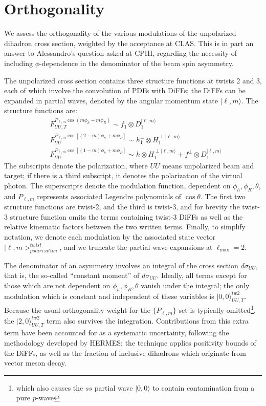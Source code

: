 \documentclass[12pt]{article}
\begin{document}
\section*{Orthogonality}

We assess the orthogonality of the various modulations of the unpolarized
dihadron cross section, weighted by the acceptance at CLAS. This is in part an
answer to Alessandro's question asked at CPHI, regarding the necessity of including
$\phi$-dependence in the denominator of the beam spin asymmetry.

The unpolarized
cross section contains three structure functions at twists 2 and 3, each of
which involve the convolution of PDFs with DiFFs; the DiFFs can be expanded in
partial waves, denoted by the angular momentum state $|\ell,m\rangle$. The
structure functions are:
\begin{align}
&F_{UU,T}^{P_{\ell,m}\cos\left(m\phi_h-m\phi_R\right)}
  \sim f_1\otimes D_1^{|\ell,m\rangle}\\
&F_{UU}^{P_{\ell,m}\cos\left[(2-m)\phi_h+m\phi_R\right]}
  \sim h_1^{\perp}\otimes H_1^{\perp|\ell,m\rangle}\\
&F_{UU}^{P_{\ell,m}\cos\left[(1-m)\phi_h+m\phi_R\right]}
  \sim h\otimes H_1^{\perp|\ell,m\rangle}+
       f^{\perp}\otimes D_1^{|\ell,m\rangle}
\end{align}
The subscripts denote the polarization, where $UU$ means unpolarized beam and
target; if there is a third subscript, it denotes the polarization of the
virtual photon. The superscripts denote the modulation function, dependent on
$\phi_h,\phi_R,\theta$, and $P_{\ell,m}$ represents associated Legendre
polynomials of $\cos\theta$. The first two structure functions are twist-2, and
the third is twist-3, and for brevity the twist-3 structure function omits the
terms containing twist-3 DiFFs as well as the relative kinematic factors between
the two written terms. Finally, to simplify notation, we denote each modulation
by the associated state vector $|\ell,m>_{polarization}^{twist}$, and we
truncate the partial wave expansions at $\ell_{\text{max}}=2$.

The denominator of an asymmetry involves an integral of the cross section
$d\sigma_{UU}$, that is, the so-called ``constant moment'' of $d\sigma_{UU}$.
Ideally, all terms except for those which are not dependent on
$\phi_h,\phi_R,\theta$ vanish under the integral; the only modulation which is
constant and independent of these variables is $|0,0\rangle_{UU,T}^{tw2}$. Because the
usual orthogonality weight for the $\{P_{\ell,m}\}$ set is typically
omitted\footnote{which also causes the $ss$ partial wave $|0,0\rangle$ to contain
contamination from a pure $p$-wave}, the $|2,0\rangle_{UU,T}^{tw2}$ term also
survives the integration. Contributions from this extra term have been accounted
for as a systematic uncertainty, following the methodology developed by HERMES;
the technique applies positivity bounds of the DiFFs, as well as the fraction of
inclusive dihadrons which originate from vector meson decay.
\end{document}
